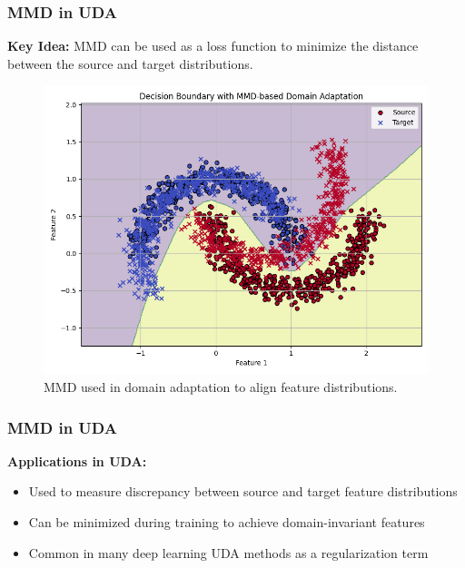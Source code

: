 \documentclass{beamer}
\begin{document}
\begin{frame}
    \frametitle{MMD in UDA}
    \textbf{Key Idea:} MMD can be used as a loss function to minimize the distance between the source and target distributions.\\

    \begin{figure}[h]
        \centering
        \includegraphics[width=0.8\linewidth]{mmd_adaptation.png}
        \caption{MMD used in domain adaptation to align feature distributions.}
    \end{figure}

\end{frame}

\begin{frame}
    \frametitle{MMD in UDA}
    
    \textbf{Applications in UDA:}
    \begin{itemize}
        \item Used to measure discrepancy between source and target feature distributions
        \item Can be minimized during training to achieve domain-invariant features
        \item Common in many deep learning UDA methods as a regularization term
    \end{itemize}

\end{frame}



\end{document}
